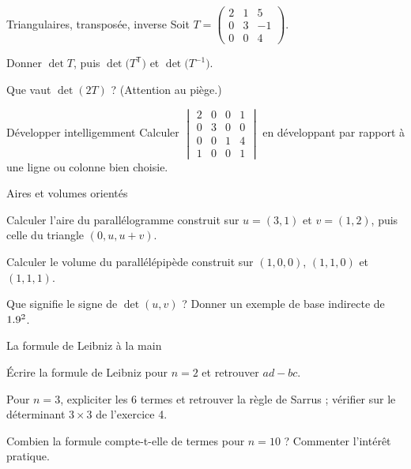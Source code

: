 \begin{exercice}[1]{Triangulaires, transposée, inverse}
Soit $T=\begin{pmatrix}2&1&5\\0&3&-1\\0&0&4\end{pmatrix}$.
\begin{questions}
  \item Donner $\det T$, puis $\det\bigl(T^{\mathsf T}\bigr)$ et
    $\det\bigl(T^{-1}\bigr)$.
  \item Que vaut $\det(2T)$ ? (Attention au piège.)
\end{questions}
\end{exercice}

\begin{exercice}[1]{Développer intelligemment}
Calculer
$\begin{vmatrix}2&0&0&1\\0&3&0&0\\0&0&1&4\\1&0&0&1\end{vmatrix}$
en développant par rapport à une ligne ou colonne bien choisie.
\end{exercice}

\begin{exercice}[1]{Aires et volumes orientés}
\begin{questions}
  \item Calculer l'aire du parallélogramme construit sur $u=(3,1)$ et
    $v=(1,2)$, puis celle du triangle $(0,u,u+v)$.
  \item Calculer le volume du parallélépipède construit sur
    $(1,0,0)$, $(1,1,0)$ et $(1,1,1)$.
  \item Que signifie le signe de $\det(u,v)$ ? Donner un exemple de base
    indirecte de $1.9^{2}$.
\end{questions}
\end{exercice}


\begin{exercice}[2]{La formule de Leibniz à la main}
\begin{questions}
  \item Écrire la formule de Leibniz pour $n=2$ et retrouver $ad-bc$.
  \item Pour $n=3$, expliciter les $6$ termes et retrouver la règle de
    Sarrus ; vérifier sur le déterminant $3\times3$ de l'exercice 4.
  \item Combien la formule compte-t-elle de termes pour $n=10$ ?
    Commenter l'intérêt pratique.
\end{questions}
\end{exercice}

